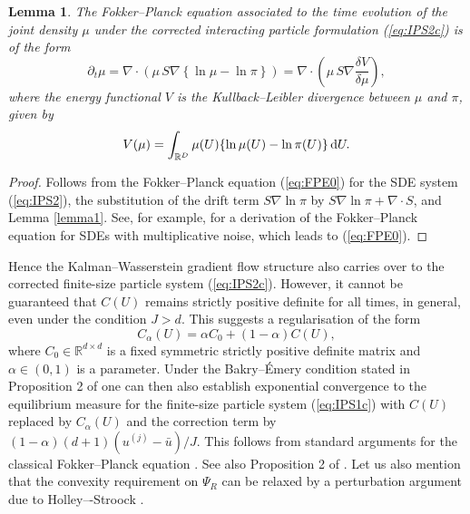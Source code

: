 \documentclass[11pt]{article}
\newtheorem{lemma}[theorem]{Lemma}
\begin{document}
\begin{lemma} \label{lemma2}
The Fokker--Planck equation associated to the time evolution of the joint density $\mu$ under the corrected interacting particle 
formulation (\ref{eq:IPS2c})  is of the form
\begin{equation} \label{eq:FPE2}
\partial_t \mu = \nabla \cdot \left( \mu\, S \nabla \left\{ \ln \mu  - \ln \pi \right\} \right)
= \nabla \cdot \left( \mu \,S \nabla \frac{\delta V}{\delta \mu}\right),
\end{equation}
where the energy functional $V$ is the Kullback--Leibler divergence between $\mu$ and $\pi$, given by
\begin{equation}
V(\mu) = \int_{\mathbb{R}^D}  \mu(U) \{\ln \mu (U) - \ln \pi(U) \} \, {\rm d}U.
\end{equation}
\end{lemma}

\begin{proof} Follows from the Fokker--Planck equation (\ref{eq:FPE0}) for the SDE system (\ref{eq:IPS2}), the substitution of
the drift term $S \nabla \ln \pi$ by $S \nabla \ln \pi + \nabla \cdot S$, and Lemma \ref{lemma1}. 
See, for example, \cite{sr:P14} for a derivation of the Fokker--Planck equation for SDEs with multiplicative noise, which leads to
(\ref{eq:FPE0}).
\end{proof}

Hence the Kalman--Wasserstein gradient flow structure also carries over to the corrected finite-size particle system (\ref{eq:IPS2c}).
However, it cannot be guaranteed that $C(U)$ remains strictly positive definite for all times, in general, even under the condition $J>d$. 
This suggests a regularisation of the form
\begin{equation}
C_{\alpha}(U) = \alpha C_0 + (1-\alpha)C(U),
\end{equation}
where $C_0 \in \mathbb{R}^{d \times d}$ is a fixed symmetric strictly positive definite matrix and $\alpha \in (0,1)$ is a parameter. Under the Bakry--{\'E}mery condition \cite{sr:P14} 
stated in Proposition 2 of \cite{sr:GIHLS19} one can then also establish exponential convergence to the equilibrium measure 
for the finite-size particle system (\ref{eq:IPS1c}) with $C(U)$ replaced by $C_\alpha(U)$ and the correction term 
by $(1-\alpha) (d+1) (u^{(j)}-\bar u)/J$. This follows from standard arguments for the classical Fokker--Planck equation
\cite{sr:P14}. See also Proposition 2 of \cite{sr:GIHLS19}. Let us also mention that the convexity requirement on $\Psi_R$ can be relaxed by a perturbation argument due to Holley–-Stroock \cite{sr:P14}. 
\end{document}

